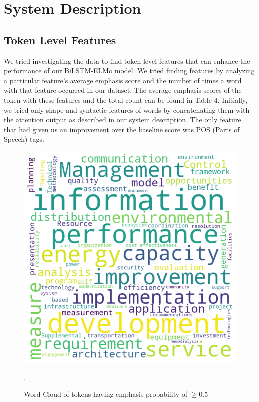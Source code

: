 \documentclass[letterpaper]{article}
\begin{document}
\section{System Description}
\subsection{Token Level Features}

We tried investigating the data to find token level features that can enhance the performance of our BiLSTM-ELMo model. We tried finding features by analyzing a particular feature's average emphasis score and the number of times a word with that feature occurred in our dataset. The average emphasis scores of the token with these features and the total count can be found in Table 4. Initially, we tried only shape and syntactic features of words by concatenating them with the attention output as described in our system description. The only feature that had given us an improvement over the baseline score was POS (Parts of Speech) tags.

\begin{figure}[h!]
\centering
\includegraphics[width=0.8\columnwidth]{word_cloud.png} %
\caption{Word Cloud of tokens having emphasis probability of $\geq0.5$}.
\label{fig1}
\end{figure}
\end{document}
